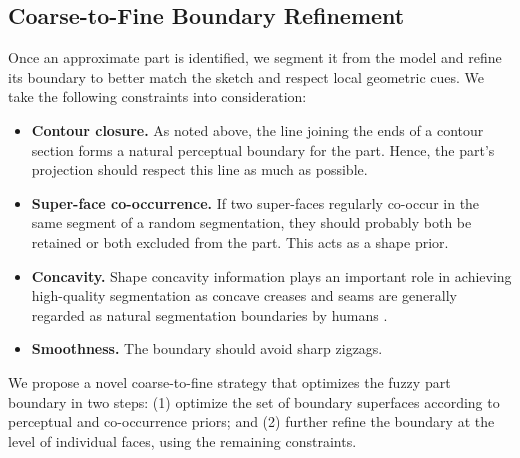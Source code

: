 \subsection{Coarse-to-Fine Boundary Refinement}
\label{sec:partrefinement}
Once an approximate part is identified, we segment it from the model and refine its boundary to better match the sketch and respect local geometric cues. We take the following constraints into consideration:
\begin{itemize}
  \item \textbf{Contour closure.} As noted above, the line joining the ends of a contour section forms a natural perceptual boundary for the part. Hence, the part's projection should respect this line as much as possible.
  \item \textbf{Super-face co-occurrence.} If two super-faces regularly co-occur in the same segment of a random segmentation, they should probably both be retained or both excluded from the part. This acts as a shape prior.
  \item \textbf{Concavity.} Shape concavity information plays an important role in achieving high-quality segmentation as concave creases and seams are generally regarded as natural segmentation boundaries by humans \cite{concavityawareyouyitvcg2012}.
  \item \textbf{Smoothness.} The boundary should avoid sharp zigzags.
\end{itemize}

We propose a novel coarse-to-fine strategy that optimizes the fuzzy part boundary in two steps: (1) optimize the set of boundary superfaces according to perceptual and co-occurrence priors; and (2) further refine the boundary at the level of individual faces, using the remaining constraints.

